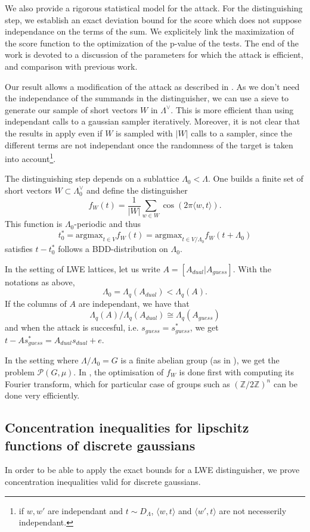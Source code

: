 \documentclass{article}
\begin{document}
We also provide a rigorous statistical model for the attack. For the distinguishing step, we establish an exact deviation bound for the score which does not suppose independance on the terms of the sum. We explicitely link the maximization of the score function to the optimization of the p-value of the tests. The end of the work is devoted to a discussion of the parameters for which the attack is efficient, and comparison with previous work. 

Our result allows a modification of the attack as described in \cite{pouly2023provable}. As we don't need the independance of the summands in the distinguisher, we can use a sieve to generate our sample of short vectors $W$ in $\Lambda^\vee$. This is more efficient than using independant calls to a gaussian sampler iteratively. Moreover, it is not clear that the results in \cite{pouly2023provable} apply even if $W$ is sampled with $|W|$ calls to a sampler, since the different terms are not independant once the randomness of the target is taken into account\footnote{if $w,w'$ are independant and $t\sim D_\Lambda$, $\langle w , t \rangle $ and $\langle w' , t \rangle $ are not necesserily independant.}.   
 
The distinguishing step depends on a sublattice $\Lambda_0 < \Lambda$. One builds a finite set of short vectors $W\subset \Lambda_0^\vee$ and define the distinguisher
$$f_W(t) = \frac{1}{|W|} \sum_{w\in W} \cos (2\pi \langle w, t\rangle ).$$ 
This function is $\Lambda_0$-periodic and thus 
$$ t_0^* = \text{argmax}_{t\in V} f_W(t) = \text{argmax}_{t\in V/\Lambda_0} f_W(t+ \Lambda_0) $$
satisfies $t - t_0^*$ follows a BDD-distribution on $\Lambda_0$.

In the setting of LWE lattices, let us write $A  = [A_{dual} | A_{guess} ]$. With the notations as above, 
$$\Lambda_0 = \Lambda_{q}(A_{dual}) < \Lambda_q(A).$$ 
If the columns of $A$ are independant, we have that 
$$\Lambda_{q}(A) / \Lambda_{q}(A_{dual}) \cong \Lambda_{q}(A_{guess})$$ 
and when the attack is succesful, i.e. $s_{guess} = s_{guess}^*$, we get $t-As_{guess}^* = A_{dual}s_{dual} + e$.

In the setting where $\Lambda / \Lambda_0 = G$ is a finite abelian group (as in \cite{ducas2023does}), we get the problem $\mathcal P(G,\mu)$. In \cite{ducas2023does}, the optimisation of $f_W$ is done first with computing its Fourier transform, which for particular case of groups such as $(\mathbb Z / 2 \mathbb Z)^n$ can be done very efficiently. 

\subsection{Concentration inequalities for lipschitz functions of discrete gaussians}
In order to be able to apply the exact bounds for a LWE distinguisher, we prove concentration inequalities valid for discrete gaussians. 
\end{document}
